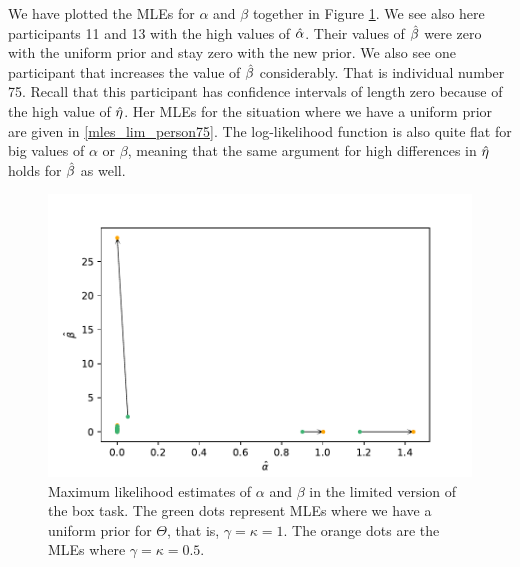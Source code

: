 We have plotted the MLEs for $\alpha$ and $\beta$ together in Figure \ref{fig:sensitivity_mles_lim_a_b}. We see also here participants 11 and 13 with the high values of $\hat{\alpha}$. Their values of $\hat{\beta}$ were zero with the uniform prior and stay zero with the new prior. We also see one participant that increases the value of $\hat{\beta}$ considerably. That is individual number 75. Recall that this participant has confidence intervals of length zero because of the high value of $\hat{\eta}$. Her MLEs for the situation where we have a uniform prior are given in \eqref{mles_lim_person75}. The log-likelihood function is also quite flat for big values of $\alpha$ or $\beta$, meaning that the same argument for high differences in $\hat{\eta}$ holds for $\hat{\beta}$ as well.  
\begin{figure}
    \centering
    \includegraphics[scale=0.7]{pictures/Sensitivity/mles_lim_a_b.pdf}
    \caption[MLEs of $\alpha$ and $\beta$ for prior with $\gamma=\kappa=1$ and $\gamma=\kappa=0.5$, limited]{
    Maximum likelihood estimates of $\alpha$ and $\beta$ in the limited version of the box task. The green dots represent MLEs where we have a uniform prior for $\Theta$, that is, $\gamma=\kappa=1$. The orange dots are the MLEs where $\gamma=\kappa=0.5$.}
    \label{fig:sensitivity_mles_lim_a_b}
\end{figure}

